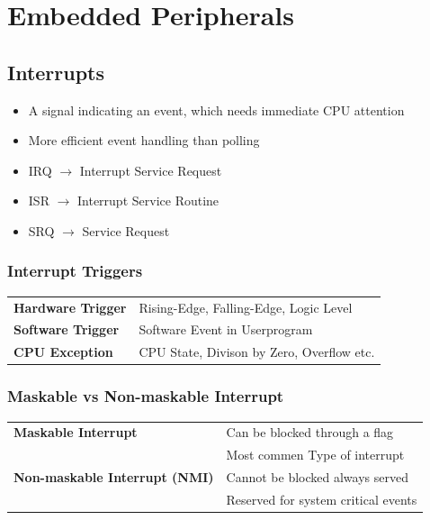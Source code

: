 \section{Embedded Peripherals}
\subsection{Interrupts }
\begin{itemize}
	\item A signal indicating an event, which needs immediate CPU attention
	\item More efficient event handling than polling
	\item IRQ $\rightarrow$ Interrupt Service Request
	\item ISR $\rightarrow$ Interrupt Service Routine
	\item SRQ $\rightarrow$ Service Request
\end{itemize}
	\subsubsection{Interrupt Triggers}
	\begin{tabular}{ll}
		\textbf{Hardware Trigger}& Rising-Edge, Falling-Edge, Logic Level\\
		\textbf{Software Trigger}& Software Event in Userprogram\\
		\textbf{CPU Exception}& CPU State, Divison by Zero, Overflow etc.\\
	\end{tabular}
	\subsubsection{Maskable vs Non-maskable Interrupt}
	\begin{tabular}{ll}
		\textbf{Maskable Interrupt}& Can be blocked through a flag\\
		& Most commen Type of interrupt\\
		\textbf{Non-maskable Interrupt (NMI)}& Cannot be blocked always served\\
		& Reserved for system critical events\\
	\end{tabular}

